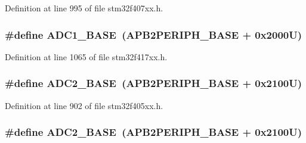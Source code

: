 Definition at line 995 of file stm32f407xx.\+h.

\subsubsection[{\texorpdfstring{A\+D\+C1\+\_\+\+B\+A\+SE}{ADC1_BASE}}]{\setlength{\rightskip}{0pt plus 5cm}\#define A\+D\+C1\+\_\+\+B\+A\+SE~({\bf A\+P\+B2\+P\+E\+R\+I\+P\+H\+\_\+\+B\+A\+SE} + 0x2000\+U)}\hypertarget{group___peripheral__registers__structures_ga695c9a2f892363a1c942405c8d351b91}{}\label{group___peripheral__registers__structures_ga695c9a2f892363a1c942405c8d351b91}


Definition at line 1065 of file stm32f417xx.\+h.

\subsubsection[{\texorpdfstring{A\+D\+C2\+\_\+\+B\+A\+SE}{ADC2_BASE}}]{\setlength{\rightskip}{0pt plus 5cm}\#define A\+D\+C2\+\_\+\+B\+A\+SE~({\bf A\+P\+B2\+P\+E\+R\+I\+P\+H\+\_\+\+B\+A\+SE} + 0x2100\+U)}\hypertarget{group___peripheral__registers__structures_ga6544abc57f9759f610eee09a02442ae6}{}\label{group___peripheral__registers__structures_ga6544abc57f9759f610eee09a02442ae6}


Definition at line 902 of file stm32f405xx.\+h.

\subsubsection[{\texorpdfstring{A\+D\+C2\+\_\+\+B\+A\+SE}{ADC2_BASE}}]{\setlength{\rightskip}{0pt plus 5cm}\#define A\+D\+C2\+\_\+\+B\+A\+SE~({\bf A\+P\+B2\+P\+E\+R\+I\+P\+H\+\_\+\+B\+A\+SE} + 0x2100\+U)}\hypertarget{group___peripheral__registers__structures_ga6544abc57f9759f610eee09a02442ae6}{}\label{group___peripheral__registers__structures_ga6544abc57f9759f610eee09a02442ae6}


